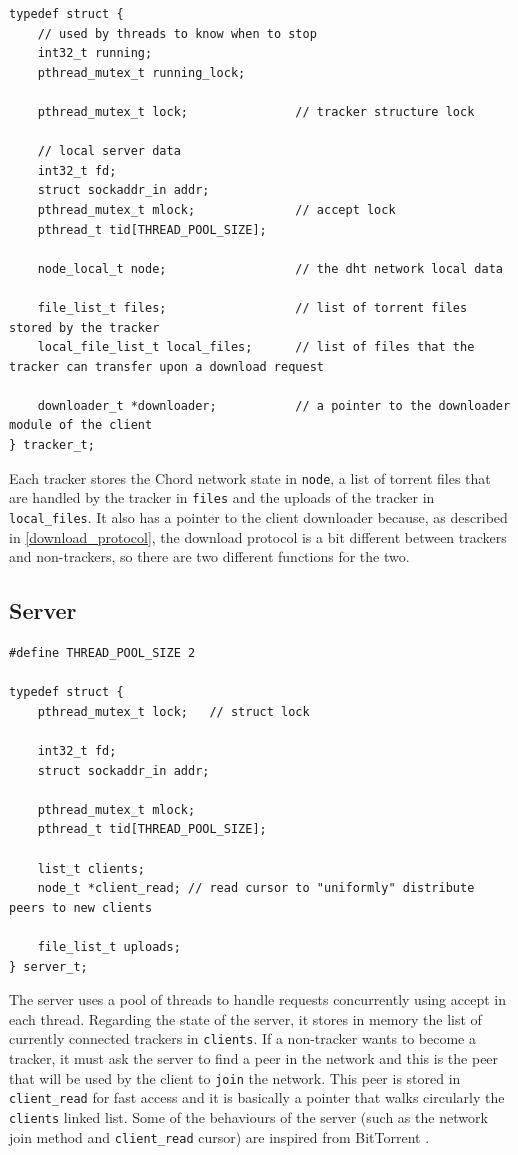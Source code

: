 \documentclass[runningheads]{llncs}
\begin{document}
\begin{lstlisting}
typedef struct {
    // used by threads to know when to stop
    int32_t running;
    pthread_mutex_t running_lock;
    
    pthread_mutex_t lock;               // tracker structure lock

    // local server data
    int32_t fd;
    struct sockaddr_in addr;
    pthread_mutex_t mlock;              // accept lock
    pthread_t tid[THREAD_POOL_SIZE];

    node_local_t node;                  // the dht network local data

    file_list_t files;                  // list of torrent files stored by the tracker
    local_file_list_t local_files;      // list of files that the tracker can transfer upon a download request

    downloader_t *downloader;           // a pointer to the downloader module of the client
} tracker_t;
\end{lstlisting}
Each tracker stores the Chord network state in \verb|node|, a list of torrent files that are handled by the tracker in \verb|files| and the uploads of the tracker in \verb|local_files|. It also has a pointer to the client downloader because, as described in \ref{download_protocol}, the download protocol is a bit different between trackers and non-trackers, so there are two different functions for the two.

\subsection{Server}
\begin{lstlisting}
#define THREAD_POOL_SIZE 2

typedef struct {
    pthread_mutex_t lock;   // struct lock

    int32_t fd;
    struct sockaddr_in addr;

    pthread_mutex_t mlock;
    pthread_t tid[THREAD_POOL_SIZE];

    list_t clients;
    node_t *client_read; // read cursor to "uniformly" distribute peers to new clients

    file_list_t uploads;
} server_t;
\end{lstlisting}
The server uses a pool of threads to handle requests concurrently using accept in each thread. Regarding the state of the server, it stores in memory the list of currently connected trackers in \verb|clients|. If a non-tracker wants to become a tracker, it must ask the server to find a peer in the network and this is the peer that will be used by the client to \verb|join| the network. This peer is stored in \verb|client_read| for fast access and it is basically a pointer that walks circularly the \verb|clients| linked list. Some of the behaviours of the server (such as the network join method and \verb|client_read| cursor) are inspired from BitTorrent \cite{ref_url4,ref_url5,ref_url6}.
\end{document}
